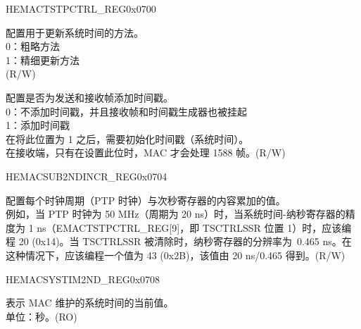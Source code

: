 \addtocounter{Regfloat}{-1}
\begin{register}{H}{EMACTSTPCTRL\_REG}{0x0700}
\begin{regdesc}\begin{reglist}
\item [接上页...]

\item [TSCFUPDT] 配置用于更新系统时间的方法。\\
0：粗略方法\\
1：精细更新方法\\(R/W)
\item [TSENA] 配置是否为发送和接收帧添加时间戳。\\
0：不添加时间戳，并且接收帧和时间戳生成器也被挂起\\
1：添加时间戳\\
在将此位置为 1 之后，需要初始化时间戳（系统时间）。\\
在接收端，只有在设置此位时，MAC 才会处理 1588 帧。(R/W)
\end{reglist}\end{regdesc}
\end{register}


\begin{register}{H}{EMACSUB2NDINCR\_REG}{0x0704}\label{regdesc:EMACSUBSECONDINCRREG}
%
%
\regnewline%
\begin{regdesc}\begin{reglist}
\item [SSINC] 配置每个时钟周期（PTP 时钟）与次秒寄存器的内容累加的值。\\
例如，当 PTP 时钟为 50 MHz（周期为 20 ns）时，当系统时间-纳秒寄存器的精度为 1 ns（EMACTSTPCTRL\_REG[9]，即 TSCTRLSSR 位置 1）时，应该编程 20 (0x14)。当 TSCTRLSSR 被清除时，纳秒寄存器的分辨率为~0.465 ns。在这种情况下，应该编程一个值为 43 (0x2B)，该值由 20 ns/0.465 得到。(R/W)
\end{reglist}\end{regdesc}
\end{register}

\begin{register}{H}{EMACSYSTIM2ND\_REG}{0x0708}\label{regdesc:EMACSYSTEMTIMESREG}
%
\regnewline%
\begin{regdesc}\begin{reglist}
\item [TSS] 表示 MAC 维护的系统时间的当前值。\\
单位：秒。(RO)
\end{reglist}\end{regdesc}
\end{register}

